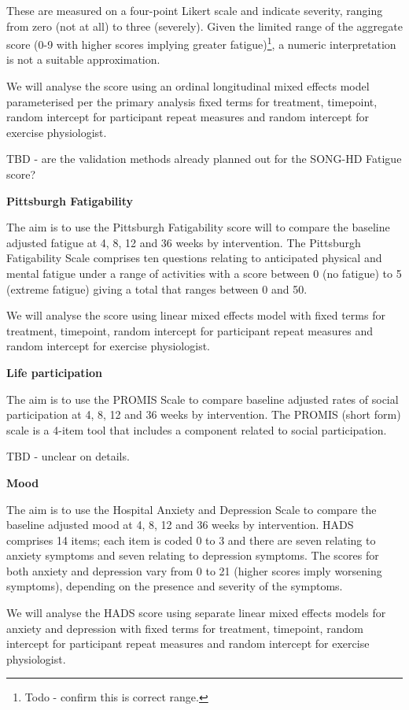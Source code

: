 \documentclass[
]{article}
\begin{document}
These are measured on a four-point Likert scale and indicate severity, ranging from zero (not at all) to three (severely).
Given the limited range of the aggregate score (0-9 with higher scores implying greater fatigue)\footnote{Todo - confirm this is correct range.}, a numeric interpretation is not a suitable approximation.

We will analyse the score using an ordinal longitudinal mixed effects model parameterised per the primary analysis fixed terms for treatment, timepoint, random intercept for participant repeat measures and random intercept for exercise physiologist.

TBD - are the validation methods already planned out for the SONG-HD Fatigue score?

\textbf{Pittsburgh Fatigability}

The aim is to use the Pittsburgh Fatigability score will to compare the baseline adjusted fatigue at 4, 8, 12 and 36 weeks by intervention.
The Pittsburgh Fatigability Scale comprises ten questions relating to anticipated physical and mental fatigue under a range of activities with a score between 0 (no fatigue) to 5 (extreme fatigue) giving a total that ranges between 0 and 50.

We will analyse the score using linear mixed effects model with fixed terms for treatment, timepoint, random intercept for participant repeat measures and random intercept for exercise physiologist.

\textbf{Life participation}

The aim is to use the PROMIS Scale to compare baseline adjusted rates of social participation at 4, 8, 12 and 36 weeks by intervention.
The PROMIS (short form) scale is a 4-item tool that includes a component related to social participation.

TBD - unclear on details.

\textbf{Mood}

The aim is to use the Hospital Anxiety and Depression Scale to compare the baseline adjusted mood at 4, 8, 12 and 36 weeks by intervention.
HADS comprises 14 items; each item is coded 0 to 3 and there are seven relating to anxiety symptoms and seven relating to depression symptoms.
The scores for both anxiety and depression vary from 0 to 21 (higher scores imply worsening symptoms), depending on the presence and severity of the symptoms.

We will analyse the HADS score using separate linear mixed effects models for anxiety and depression with fixed terms for treatment, timepoint, random intercept for participant repeat measures and random intercept for exercise physiologist.
\end{document}
